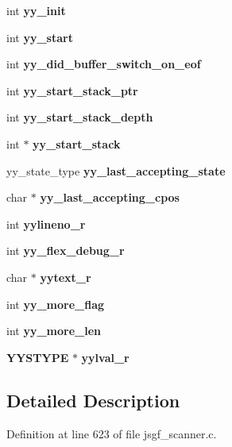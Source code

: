\begin{DoxyCompactItemize}
\mbox{\label{structyyguts__t_abbef56b2d8359f6a15629c104f5dd030}} 
int {\bfseries yy\+\_\+init}
\item 
\mbox{\label{structyyguts__t_a8baf7d47fe53035d9bc2a9670795ff01}} 
int {\bfseries yy\+\_\+start}
\item 
\mbox{\label{structyyguts__t_a2daec411627700709ef2fd927e69627d}} 
int {\bfseries yy\+\_\+did\+\_\+buffer\+\_\+switch\+\_\+on\+\_\+eof}
\item 
\mbox{\label{structyyguts__t_ad9e132dacc2904a8ae76c64c72e33795}} 
int {\bfseries yy\+\_\+start\+\_\+stack\+\_\+ptr}
\item 
\mbox{\label{structyyguts__t_a35bedf1c17debd766565b99c39132eb4}} 
int {\bfseries yy\+\_\+start\+\_\+stack\+\_\+depth}
\item 
\mbox{\label{structyyguts__t_af6e2e45a5fdba0f313c680b35da4292a}} 
int $\ast$ {\bfseries yy\+\_\+start\+\_\+stack}
\item 
\mbox{\label{structyyguts__t_a84e01a3658729e9d69f79feb3faf1c99}} 
yy\+\_\+state\+\_\+type {\bfseries yy\+\_\+last\+\_\+accepting\+\_\+state}
\item 
\mbox{\label{structyyguts__t_a46fb8d232ed375921af0b37caeeb67c4}} 
char $\ast$ {\bfseries yy\+\_\+last\+\_\+accepting\+\_\+cpos}
\item 
\mbox{\label{structyyguts__t_aa9f13776b8d311e847cc7d974d49af4c}} 
int {\bfseries yylineno\+\_\+r}
\item 
\mbox{\label{structyyguts__t_a5ad72d75ed6d693824fe7e02ce21118e}} 
int {\bfseries yy\+\_\+flex\+\_\+debug\+\_\+r}
\item 
\mbox{\label{structyyguts__t_aebaa731ad6cbe2411d104925e5bb3f2c}} 
char $\ast$ {\bfseries yytext\+\_\+r}
\item 
\mbox{\label{structyyguts__t_a664a72171cc3e720fcb8120af9b72883}} 
int {\bfseries yy\+\_\+more\+\_\+flag}
\item 
\mbox{\label{structyyguts__t_a683563bf4cd73f25b4c7b78579c1330e}} 
int {\bfseries yy\+\_\+more\+\_\+len}
\item 
\mbox{\label{structyyguts__t_a55dbdcd46a36d34adcbfc29be44d10cf}} 
\textbf{ Y\+Y\+S\+T\+Y\+PE} $\ast$ {\bfseries yylval\+\_\+r}
\end{DoxyCompactItemize}


\subsection{Detailed Description}


Definition at line 623 of file jsgf\+\_\+scanner.\+c.



